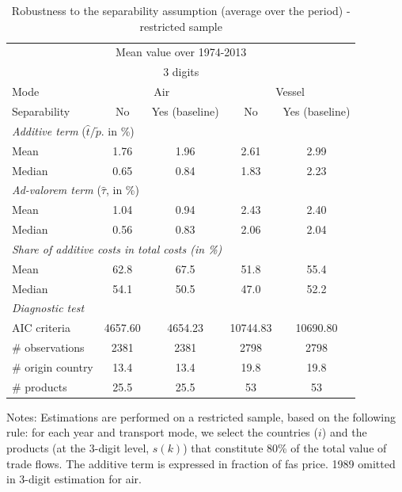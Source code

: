 \documentclass[a4paper,11pt]{article}
\begin{document}
\begin{table}[htbp]
  \centering
  \caption{Robustness to the separability assumption (average over the period) - restricted sample}
\begin{center}
    \begin{tabular}{lcc|cc}
    \hline \hline
    \multicolumn{5}{c}{Mean value over 1974-2013} \\
 \multicolumn{5}{c}{3 digits} \\    \hline \hline
   Mode  & \multicolumn{2}{c|}{Air} & \multicolumn{2}{c}{Vessel} \\ \hline
   Separability & No  & Yes (baseline) & No & Yes (baseline)\\ \hline
    \multicolumn{5}{l}{\textit{Additive term} ($\widehat{t}/\widetilde{p}$.
in \%)}  \\
    Mean  & 1.76 & 1.96 & 2.61 & 2.99 \\
    Median &0.65 & 0.84 &1.83 & 2.23 \\ \hline
    \multicolumn{5}{l}{\textit{Ad-valorem term} ($\widehat{\tau}$, in \%)}\\
    Mean  & 1.04 & 0.94 & 2.43 & 2.40 \\
    Median & 0.56 & 0.83 & 2.06 & 2.04 \\ \hline
\multicolumn{5}{l}{\textit{Share of additive costs in total costs (in \%)}} \\
    Mean  & 62.8  & 67.5  & 51.8  & 55.4 \\
    Median & 54.1  & 50.5  & 47.0  & 52.2 \\  \hline
 \textit{Diagnostic test} & & &  &  \\
    AIC criteria & 4657.60 & 4654.23 & 10744.83 & 10690.80 \\ \hline
\# observations & 2381 & 2381 & 2798 & 2798 \\
\# origin country & 13.4 & 13.4 & 19.8 & 19.8 \\
\# products & 25.5 & 25.5 & 53 & 53 \\ \hline \hline
    \end{tabular}%
\end{center}
\parbox[l]{12cm}{\footnotesize{Notes: Estimations are performed on a restricted sample, based on the following rule: for each year and transport mode, we select the countries ($i$) and the products (at the 3-digit level, $s(k)$) that constitute 80\% of the total value of trade flows.
The additive term is expressed in fraction of fas price. 1989 omitted in 3-digit estimation for air.}}
\label{tab:robustness_separability}
\end{table}
\end{document}
